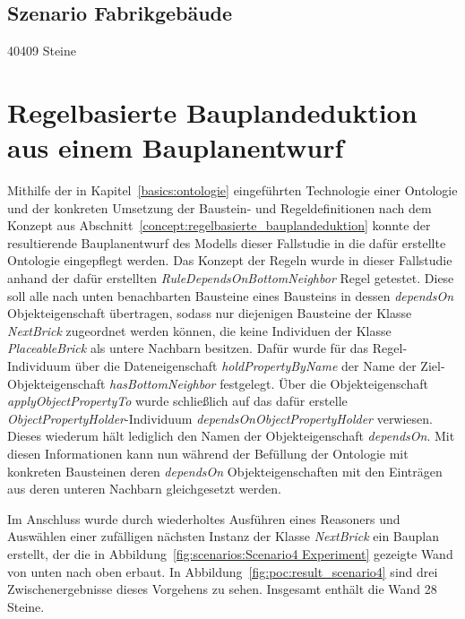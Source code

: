\subsection{Szenario Fabrikgebäude}\label{poc:scenario3}
40409 Steine
\section{Regelbasierte Bauplandeduktion aus einem Bauplanentwurf}
Mithilfe der in Kapitel~\ref{basics:ontologie} eingeführten Technologie einer Ontologie und der konkreten Umsetzung der Baustein- und Regeldefinitionen nach dem Konzept aus Abschnitt~\ref{concept:regelbasierte_bauplandeduktion} 
konnte der resultierende Bauplanentwurf des Modells dieser Fallstudie in die dafür erstellte Ontologie eingepflegt werden.
Das Konzept der Regeln wurde in dieser Fallstudie anhand der dafür erstellten \textit{RuleDependsOnBottomNeighbor} Regel getestet.
Diese soll alle nach unten benachbarten Bausteine eines Bausteins in dessen \textit{dependsOn} Objekteigenschaft übertragen, sodass nur diejenigen Bausteine der Klasse \textit{NextBrick} zugeordnet werden können, die keine Individuen der Klasse \textit{PlaceableBrick} als untere Nachbarn besitzen.
Dafür wurde für das Regel-Individuum über die Dateneigenschaft \textit{holdPropertyByName} der Name der Ziel-Objekteigenschaft \textit{hasBottomNeighbor} festgelegt.
Über die Objekteigenschaft \textit{applyObjectPropertyTo} wurde schließlich auf das dafür erstelle \textit{ObjectPropertyHolder}-Individuum \textit{dependsOnObjectPropertyHolder} verwiesen.
Dieses wiederum hält lediglich den Namen der Objekteigenschaft \textit{dependsOn}.
Mit diesen Informationen kann nun während der Befüllung der Ontologie mit konkreten Bausteinen deren \textit{dependsOn} Objekteigenschaften mit den Einträgen aus deren unteren Nachbarn gleichgesetzt werden.

Im Anschluss wurde durch wiederholtes Ausführen eines Reasoners und Auswählen einer zufälligen nächsten Instanz der Klasse \textit{NextBrick} ein Bauplan erstellt, der die in Abbildung~\ref{fig:scenarios:Scenario4 Experiment} gezeigte Wand von unten nach oben erbaut.
In Abbildung~\ref{fig:poc:result_scenario4} sind drei Zwischenergebnisse dieses Vorgehens zu sehen.
Insgesamt enthält die Wand 28 Steine.

